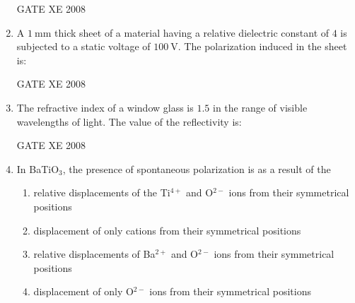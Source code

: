 \documentclass[12pt]{article}
\begin{document}
\begin{enumerate}[label=Q\arabic*.]
GATE XE 2008

\item A $1 \ \mathrm{mm}$ thick sheet of a material having a relative dielectric constant of $4$ is subjected to a static voltage of $100 \ \mathrm{V}$. The polarization induced in the sheet is:

\begin{enumerate}[label=(\Alph*)]
\end{enumerate}

GATE XE 2008

\item The refractive index of a window glass is $1.5$ in the range of visible wavelengths of light. The value of the reflectivity is:

\begin{enumerate}[label=(\Alph*)]
\end{enumerate}

GATE XE 2008

\item In BaTiO$_3$, the presence of spontaneous polarization is as a result of the

\begin{enumerate}[label=(\Alph*)]

\item  relative displacements of the Ti$^{4+}$ and O$^{2-}$ ions from their symmetrical positions 
\item  displacement of only cations from their symmetrical positions
\item  relative displacements of Ba$^{2+}$ and O$^{2-}$ ions from their symmetrical positions
\item  displacement of only O$^{2-}$ ions from their symmetrical positions
\end{enumerate}


\end{enumerate}
\end{document}
